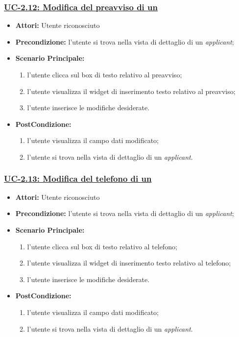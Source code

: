 \subsubsection{\underline{UC-2.12: Modifica del preavviso di un \applicant}}
\begin{itemize}
	\item \textbf{Attori:} Utente riconosciuto
	\item \textbf{Precondizione:}  l'utente si trova nella vista di dettaglio di un \textit{applicant};
	\item \textbf{Scenario Principale:}
	\begin{enumerate}
		\item l'utente clicca sul box di testo relativo al preavviso;
		\item l'utente visualizza il  widget di inserimento testo relativo al preavviso;
		\item l'utente inserisce le modifiche desiderate.
	\end{enumerate}
	\item \textbf{PostCondizione:} 
	\begin{enumerate}
		\item l'utente visualizza il campo dati modificato;
		\item l'utente si trova nella vista di dettaglio di un \textit{applicant}.
	\end{enumerate}
	
\end{itemize}

\subsubsection{\underline{UC-2.13: Modifica del telefono di un \applicant}}
\begin{itemize}
	\item \textbf{Attori:} Utente riconosciuto
	\item \textbf{Precondizione:}  l'utente si trova nella vista di dettaglio di un \textit{applicant};
	\item \textbf{Scenario Principale:}
	\begin{enumerate}
		\item l'utente clicca sul box di testo relativo al telefono;
		\item l'utente visualizza il  widget di inserimento testo relativo al telefono;
		\item l'utente inserisce le modifiche desiderate.
	\end{enumerate}
	\item \textbf{PostCondizione:} 
	\begin{enumerate}
		\item l'utente visualizza il campo dati modificato;
		\item l'utente si trova nella vista di dettaglio di un \textit{applicant}.
	\end{enumerate}
	
\end{itemize}


